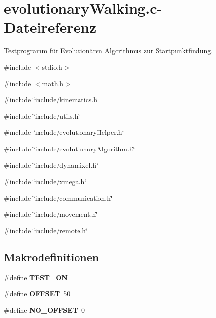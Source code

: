 \section{evolutionaryWalking.c-\/Dateireferenz}
\label{evolutionary_walking_8c}


Testprogramm für Evolutionären Algorithmus zur Startpunktfindung.  


{\ttfamily \#include $<$stdio.h$>$}\par
{\ttfamily \#include $<$math.h$>$}\par
{\ttfamily \#include \char`\"{}include/kinematics.h\char`\"{}}\par
{\ttfamily \#include \char`\"{}include/utils.h\char`\"{}}\par
{\ttfamily \#include \char`\"{}include/evolutionaryHelper.h\char`\"{}}\par
{\ttfamily \#include \char`\"{}include/evolutionaryAlgorithm.h\char`\"{}}\par
{\ttfamily \#include \char`\"{}include/dynamixel.h\char`\"{}}\par
{\ttfamily \#include \char`\"{}include/xmega.h\char`\"{}}\par
{\ttfamily \#include \char`\"{}include/communication.h\char`\"{}}\par
{\ttfamily \#include \char`\"{}include/movement.h\char`\"{}}\par
{\ttfamily \#include \char`\"{}include/remote.h\char`\"{}}\par
\subsection*{Makrodefinitionen}
\begin{DoxyCompactItemize}
\item 
\#define {\bf TEST\_\-ON}
\item 
\#define {\bf OFFSET}~50
\item 
\#define {\bf NO\_\-OFFSET}~0
\end{DoxyCompactItemize}
